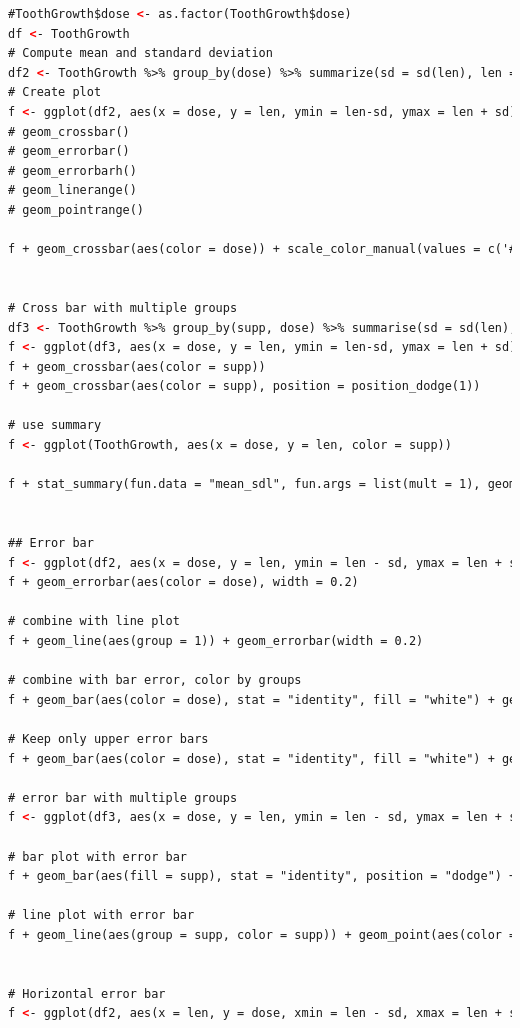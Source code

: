 \begin{lstlisting}[language=html]
#ToothGrowth$dose <- as.factor(ToothGrowth$dose)
df <- ToothGrowth
# Compute mean and standard deviation
df2 <- ToothGrowth %>% group_by(dose) %>% summarize(sd = sd(len), len = mean(len))
# Create plot
f <- ggplot(df2, aes(x = dose, y = len, ymin = len-sd, ymax = len + sd))
# geom_crossbar() 
# geom_errorbar()
# geom_errorbarh()
# geom_linerange()
# geom_pointrange()

f + geom_crossbar(aes(color = dose)) + scale_color_manual(values = c('#999999', "#E69F00", "#56B4E9")) + theme_minimal()


# Cross bar with multiple groups
df3 <- ToothGrowth %>% group_by(supp, dose) %>% summarise(sd = sd(len), len = mean(len))
f <- ggplot(df3, aes(x = dose, y = len, ymin = len-sd, ymax = len + sd))
f + geom_crossbar(aes(color = supp))
f + geom_crossbar(aes(color = supp), position = position_dodge(1))

# use summary
f <- ggplot(ToothGrowth, aes(x = dose, y = len, color = supp))

f + stat_summary(fun.data = "mean_sdl", fun.args = list(mult = 1), geom = "crossbar", width = 0.6, position = position_dodge(0.8))


## Error bar
f <- ggplot(df2, aes(x = dose, y = len, ymin = len - sd, ymax = len + sd))
f + geom_errorbar(aes(color = dose), width = 0.2)

# combine with line plot
f + geom_line(aes(group = 1)) + geom_errorbar(width = 0.2)

# combine with bar error, color by groups
f + geom_bar(aes(color = dose), stat = "identity", fill = "white") + geom_errorbar(aes(color = dose), width = 0.2)

# Keep only upper error bars
f + geom_bar(aes(color = dose), stat = "identity", fill = "white") + geom_errorbar(aes(color = dose, ymin = len), width = 0.2)

# error bar with multiple groups
f <- ggplot(df3, aes(x = dose, y = len, ymin = len - sd, ymax = len + sd))

# bar plot with error bar
f + geom_bar(aes(fill = supp), stat = "identity", position = "dodge") + geom_errorbar(aes(color = supp), position = "dodge")

# line plot with error bar
f + geom_line(aes(group = supp, color = supp)) + geom_point(aes(color = supp)) + geom_errorbar(aes(color = supp), width = 0.2, position = position_dodge(0.05))


# Horizontal error bar
f <- ggplot(df2, aes(x = len, y = dose, xmin = len - sd, xmax = len + sd))



\end{lstlisting}
